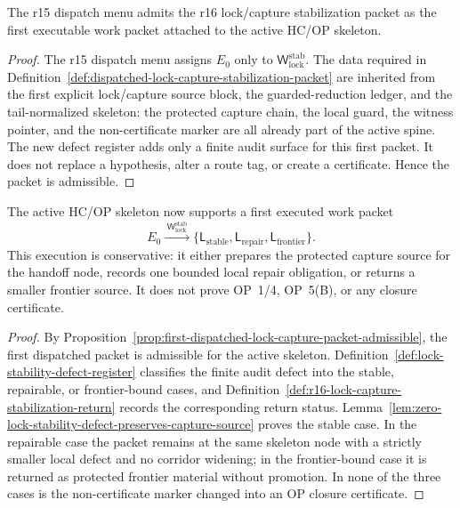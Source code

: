 \begin{proposition}
\label{prop:first-dispatched-lock-capture-packet-admissible}
The r15 dispatch menu admits the r16 lock/capture stabilization packet as the first executable work packet attached to the active HC/OP skeleton.
\end{proposition}

\begin{proof}
The r15 dispatch menu assigns \(E_0\) only to \(\mathsf W_{\mathrm{lock}}^{\mathrm{stab}}\).  The data required in Definition~\ref{def:dispatched-lock-capture-stabilization-packet} are inherited from the first explicit lock/capture source block, the guarded-reduction ledger, and the tail-normalized skeleton: the protected capture chain, the local guard, the witness pointer, and the non-certificate marker are all already part of the active spine.  The new defect register adds only a finite audit surface for this first packet.  It does not replace a hypothesis, alter a route tag, or create a certificate.  Hence the packet is admissible.
\end{proof}

\begin{theorem}
\label{thm:first-dispatched-lock-capture-stabilization-packet}
The active HC/OP skeleton now supports a first executed work packet
\[
  E_0
  \xrightarrow{\;\mathsf W_{\mathrm{lock}}^{\mathrm{stab}}\;}
  \{\mathsf L_{\mathrm{stable}},\mathsf L_{\mathrm{repair}},\mathsf L_{\mathrm{frontier}}\}.
\]
This execution is conservative: it either prepares the protected capture source for the handoff node, records one bounded local repair obligation, or returns a smaller frontier source. It does not prove OP~1/4, OP~5(B), or any closure certificate.
\end{theorem}

\begin{proof}
By Proposition~\ref{prop:first-dispatched-lock-capture-packet-admissible}, the first dispatched packet is admissible for the active skeleton.  Definition~\ref{def:lock-stability-defect-register} classifies the finite audit defect into the stable, repairable, or frontier-bound cases, and Definition~\ref{def:r16-lock-capture-stabilization-return} records the corresponding return status.  Lemma~\ref{lem:zero-lock-stability-defect-preserves-capture-source} proves the stable case.  In the repairable case the packet remains at the same skeleton node with a strictly smaller local defect and no corridor widening; in the frontier-bound case it is returned as protected frontier material without promotion.  In none of the three cases is the non-certificate marker changed into an OP closure certificate.
\end{proof}

